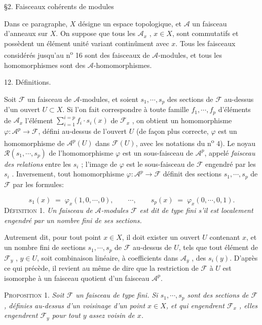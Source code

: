 §2. Faisceaux cohérents de modules

Dans ce paragraphe, $X$ désigne un espace topologique, et $\mathcal{A}$ un faisceau d'anneaux sur $X$. On suppose que tous les $\mathcal{A}_x$ , $x \in X$, sont commutatifs et possèdent un élément unité variant continûment avec $x$. Tous les faisceaux considérés jusqu'au n\textsuperscript{o} 16 sont des faisceaux de $\mathcal{A}$-modules, et tous les homomorphismes sont des $\mathcal{A}$-homomorphismes.


12. Définitions.

Soit $\mathcal{F}$ un faisceau de $\mathcal{A}$-modules, et soient $s_1 , \cdots , s_p$ des sections de $\mathcal{F}$ au-dessus d'un ouvert $U \subset X$. Si l'on fait correspondre à toute famille $f_1 , \cdots , f_p$ d'éléments de $\mathcal{A}_x$ l'élément $\sum_{i=1}^{i=p} f_i \cdot s_i(x)$ de $\mathcal{F}_x$ , on obtient un homomorphisme $\varphi : \mathcal{A}^p \to \mathcal{F}$, défini au-dessus de l'ouvert $U$ (de façon plus correcte, $\varphi$ est un homomorphisme de $\mathcal{A}^p(U)$ dans $\mathcal{F}(U)$, avec les notations du n\textsuperscript{o} 4). Le noyau $\mathcal{R}(s_1 , \cdots , s_p)$ de l'homomorphisme $\varphi$ est un sous-faisceau de $\mathcal{A}^p$, appelé \textit{faisceau des relations} entre les $s_i$ ; l'image de $\varphi$ est le sous-faisceau de $\mathcal{F}$ engendré par les $s_i$ . Inversement, tout homomorphisme $\varphi : \mathcal{A}^p \to \mathcal{F}$ définit des sections $s_1 , \cdots , s_p$ de $\mathcal{F}$ par les formules:

\begin{equation*}
s_1(x) \;=\; \varphi_x(1, 0, \cdots , 0), \qquad \cdots , \qquad s_p(x) \;=\; \varphi_x(0, \cdots , 0, 1).
\end{equation*}
\textsc{Définition} 1. \textit{Un faisceau de $\mathcal{A}$-modules $\mathcal{F}$ est dit de type fini s'il est localement engendré par un nombre fini de ses sections.}

Autrement dit, pour tout point $x \in X$, il doit exister un ouvert $U$ contenant $x$, et un nombre fini de sections $s_1 , \cdots , s_p$ de $\mathcal{F}$ au-dessus de $U$, tels que tout élément de $\mathcal{F}_y$ , $y \in U$, soit combinaison linéaire, à coefficients dans $\mathcal{A}_y$ , des $s_i(y)$. D'après ce qui précède, il revient au même de dire que la restriction de $\mathcal{F}$ à $U$ est isomorphe à un faisceau quotient d'un faisceau $\mathcal{A}^p$.

\textsc{Proposition} 1. \textit{Soit $\mathcal{F}$ un faisceau de type fini. Si $s_1 , \cdots , s_p$ sont des sections de $\mathcal{F}$, définies au-dessus d'un voisinage d'un point $x \in X$, et qui engendrent $\mathcal{F}_x$ , elles engendrent $\mathcal{F}_y$ pour tout $y$ assez voisin de $x$.}

